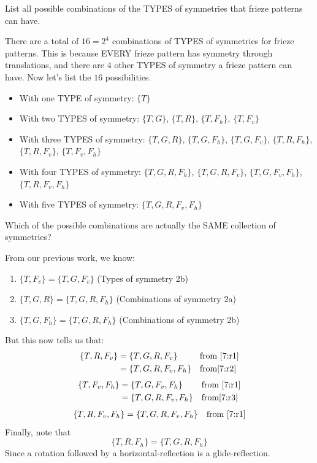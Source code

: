 \documentclass[noauthor,nooutcomes,12pt,hints,handout]{ximera}
\begin{document}
\mynewpage


\begin{question}
  List all possible combinations of the TYPES of symmetries that
  frieze patterns can have.
  \begin{freeResponse}
    There are a total of $16 = 2^4$ combinations of TYPES of
    symmetries for frieze patterns. This is because EVERY frieze
    pattern has symmetry through translations, and there are $4$ other
    TYPES of symmetry a frieze pattern can have.  Now let's list the
    $16$ possibilities.
    \begin{itemize}
    \item With one TYPE of symmetry: $\{T\}$
    \item With two TYPES of symmetry: $\{T,G\}$, $\{T,R\}$, $\{T,F_h\}$, $\{T,F_v\}$
    \item With three TYPES of symmetry: $\{T,G,R\}$, $\{T,G,F_h\}$, $\{T,G,F_v\}$, $\{T,R,F_h\}$, $\{T,R,F_v\}$, $\{T,F_v,F_h\}$
    \item With four TYPES of symmetry:  $\{T,G,R,F_h\}$, $\{T,G,R,F_v\}$, $\{T,G,F_v,F_h\}$, $\{T,R,F_v,F_h\}$
    \item With five TYPES of symmetry: $\{T,G,R,F_v,F_h\}$
    \end{itemize}
  \end{freeResponse}
\end{question}
\mynewpage

\begin{question}
  Which of the possible combinations are actually the SAME collection
  of symmetries?
  \begin{freeResponse}
    From our previous work, we know:
    \begin{enumerate}
    \item\label{7:r1} $\{T,F_v\} = \{T,G,F_v\}$ (Types of symmetry 2b)
    \item\label{7:r2} $\{T,G,R\} = \{T,G,R,F_h\}$ (Combinations of symmetry 2a)
    \item\label{7:r3} $\{T,G,F_h\} = \{T,G,R,F_h\}$ (Combinations of symmetry 2b)
    \end{enumerate}
    But this now tells us that:
    \begin{align*}
      \{T,R,F_v\} &= \{T,G,R,F_v\} & &\text{from \ref{7:r1}}\\
      &= \{T,G,R,F_v,F_h\} & &\text{from\ref{7:r2}}
    \end{align*}
    \begin{align*}
      \{T,F_v,F_h\} &= \{T,G,F_v,F_h\}& &\text{from \ref{7:r1}} \\
      &= \{T,G,R,F_v,F_h\} & &\text{from\ref{7:r3}}
    \end{align*}
    \begin{align*}
      \{T,R,F_v,F_h\} &= \{T,G,R,F_v,F_h\} & &\text{from \ref{7:r1}}\\
    \end{align*}
    Finally, note that
    \[
    \{T,R,F_h\} = \{T,G,R,F_h\}
    \]
    Since a rotation followed by a horizontal-reflection is a
    glide-reflection.
  \end{freeResponse}
\end{question}
\mynewpage
\end{document}
